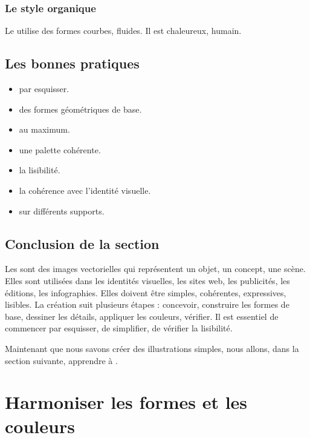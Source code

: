 \subsubsection{Le style organique}

Le  utilise des formes courbes, fluides. Il est chaleureux, humain.

\subsection{Les bonnes pratiques}

\begin{itemize}
    \item {} par esquisser.
    \item {} des formes géométriques de base.
    \item {} au maximum.
    \item {} une palette cohérente.
    \item {} la lisibilité.
    \item {} la cohérence avec l'identité visuelle.
    \item {} sur différents supports.
\end{itemize}

\subsection*{Conclusion de la section}

Les  sont des images vectorielles qui représentent un objet, un concept, une scène. Elles sont utilisées dans les identités visuelles, les sites web, les publicités, les éditions, les infographies. Elles doivent être simples, cohérentes, expressives, lisibles. La création suit plusieurs étapes : concevoir, construire les formes de base, dessiner les détails, appliquer les couleurs, vérifier. Il est essentiel de commencer par esquisser, de simplifier, de vérifier la lisibilité.

Maintenant que nous savons créer des illustrations simples, nous allons, dans la section suivante, apprendre à .

\section{Harmoniser les formes et les couleurs}

